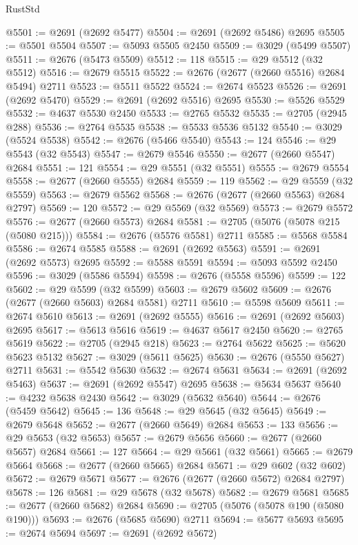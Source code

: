 \begin{lexlean}{RustStd}
\begin{coremodule}
@5501 := @2691 (@2692 @5477)
@5504 := @2691 (@2692 @5486) @2695
@5505 := @5501 @5504
@5507 := @5093 @5505 @2450
@5509 := @3029 (@5499 @5507)
@5511 := @2676 (@5473 @5509)
@5512 := 118
@5515 := @29 @5512 (@32 @5512)
@5516 := @2679 @5515
@5522 := @2676 (@2677 (@2660 @5516) @2684 @5494) @2711
@5523 := @5511 @5522
@5524 := @2674 @5523
@5526 := @2691 (@2692 @5470)
@5529 := @2691 (@2692 @5516) @2695
@5530 := @5526 @5529
@5532 := @4637 @5530 @2450
@5533 := @2765 @5532
@5535 := @2705 (@2945 @288)
@5536 := @2764 @5535
@5538 := @5533 @5536 @5132
@5540 := @3029 (@5524 @5538)
@5542 := @2676 (@5466 @5540)
@5543 := 124
@5546 := @29 @5543 (@32 @5543)
@5547 := @2679 @5546
@5550 := @2677 (@2660 @5547) @2684
@5551 := 121
@5554 := @29 @5551 (@32 @5551)
@5555 := @2679 @5554
@5558 := @2677 (@2660 @5555) @2684
@5559 := 119
@5562 := @29 @5559 (@32 @5559)
@5563 := @2679 @5562
@5568 := @2676 (@2677 (@2660 @5563) @2684 @2797)
@5569 := 120
@5572 := @29 @5569 (@32 @5569)
@5573 := @2679 @5572
@5576 := @2677 (@2660 @5573) @2684
@5581 := @2705 (@5076 (@5078 @215 (@5080 @215)))
@5584 := @2676 (@5576 @5581) @2711
@5585 := @5568 @5584
@5586 := @2674 @5585
@5588 := @2691 (@2692 @5563)
@5591 := @2691 (@2692 @5573) @2695
@5592 := @5588 @5591
@5594 := @5093 @5592 @2450
@5596 := @3029 (@5586 @5594)
@5598 := @2676 (@5558 @5596)
@5599 := 122
@5602 := @29 @5599 (@32 @5599)
@5603 := @2679 @5602
@5609 := @2676 (@2677 (@2660 @5603) @2684 @5581) @2711
@5610 := @5598 @5609
@5611 := @2674 @5610
@5613 := @2691 (@2692 @5555)
@5616 := @2691 (@2692 @5603) @2695
@5617 := @5613 @5616
@5619 := @4637 @5617 @2450
@5620 := @2765 @5619
@5622 := @2705 (@2945 @218)
@5623 := @2764 @5622
@5625 := @5620 @5623 @5132
@5627 := @3029 (@5611 @5625)
@5630 := @2676 (@5550 @5627) @2711
@5631 := @5542 @5630
@5632 := @2674 @5631
@5634 := @2691 (@2692 @5463)
@5637 := @2691 (@2692 @5547) @2695
@5638 := @5634 @5637
@5640 := @4232 @5638 @2430
@5642 := @3029 (@5632 @5640)
@5644 := @2676 (@5459 @5642)
@5645 := 136
@5648 := @29 @5645 (@32 @5645)
@5649 := @2679 @5648
@5652 := @2677 (@2660 @5649) @2684
@5653 := 133
@5656 := @29 @5653 (@32 @5653)
@5657 := @2679 @5656
@5660 := @2677 (@2660 @5657) @2684
@5661 := 127
@5664 := @29 @5661 (@32 @5661)
@5665 := @2679 @5664
@5668 := @2677 (@2660 @5665) @2684
@5671 := @29 @602 (@32 @602)
@5672 := @2679 @5671
@5677 := @2676 (@2677 (@2660 @5672) @2684 @2797)
@5678 := 126
@5681 := @29 @5678 (@32 @5678)
@5682 := @2679 @5681
@5685 := @2677 (@2660 @5682) @2684
@5690 := @2705 (@5076 (@5078 @190 (@5080 @190)))
@5693 := @2676 (@5685 @5690) @2711
@5694 := @5677 @5693
@5695 := @2674 @5694
@5697 := @2691 (@2692 @5672)

\end{coremodule}
\end{lexlean}
